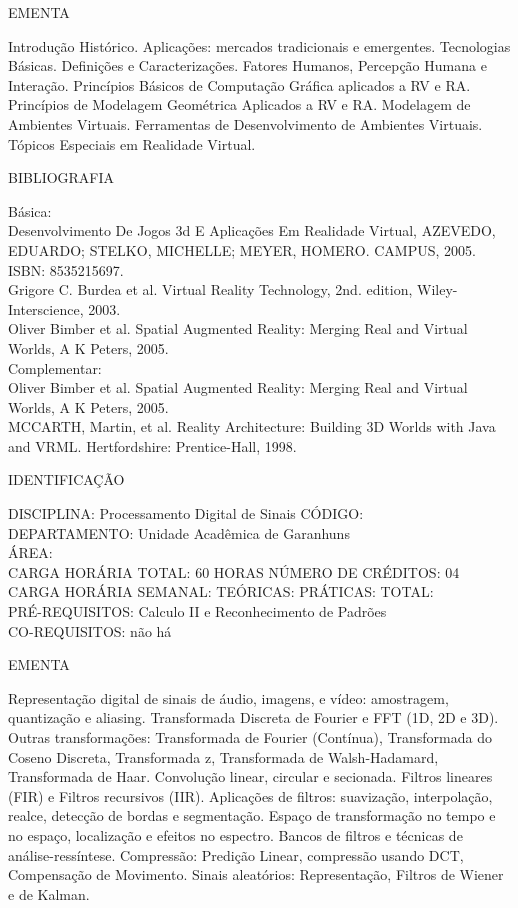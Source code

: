 \documentclass[
	12pt,				%
	openright,			%
  oneside,     %
	a4paper,			%
	chapter=TITLE,		%
	english,			%
	french,				%
	spanish,			%
	brazil				%
	]{abntex2}
\begin{document}
\begin{apendicesenv}
EMENTA 

Introdução  Histórico. Aplicações: mercados tradicionais e
emergentes. Tecnologias Básicas. Definições e Caracterizações. Fatores
Humanos, Percepção Humana e Interação. Princípios Básicos de Computação
Gráfica aplicados a RV e RA. Princípios de Modelagem Geométrica
Aplicados a RV e RA. Modelagem de Ambientes Virtuais. Ferramentas de
Desenvolvimento de Ambientes Virtuais. Tópicos Especiais em Realidade
Virtual.

BIBLIOGRAFIA 

Básica:\\
Desenvolvimento De Jogos 3d E Aplicações Em Realidade Virtual, AZEVEDO,
EDUARDO; STELKO, MICHELLE; MEYER, HOMERO. CAMPUS, 2005. ISBN:
8535215697.\\
Grigore C. Burdea et al. Virtual Reality Technology, 2nd. edition,
Wiley-Interscience, 2003.\\
Oliver Bimber et al. Spatial Augmented Reality: Merging Real and Virtual
Worlds, A K Peters, 2005.\\
Complementar:\\
Oliver Bimber et al. Spatial Augmented Reality: Merging Real and Virtual
Worlds, A K Peters, 2005.\\
MCCARTH, Martin, et al. Reality Architecture: Building 3D Worlds with
Java and VRML. Hertfordshire: Prentice-Hall, 1998.

\newpage IDENTIFICAÇÃO

DISCIPLINA: Processamento Digital de Sinais CÓDIGO:\\
DEPARTAMENTO: Unidade Acadêmica de Garanhuns\\
ÁREA:\\
CARGA HORÁRIA TOTAL: 60 HORAS NÚMERO DE CRÉDITOS: 04\\
CARGA HORÁRIA SEMANAL: TEÓRICAS: PRÁTICAS: TOTAL:\\
PRÉ-REQUISITOS: Calculo II e Reconhecimento de Padrões\\
CO-REQUISITOS: não há

EMENTA 

Representação digital de sinais de áudio, imagens, e vídeo: amostragem,
quantização e  aliasing. Transformada Discreta de Fourier e FFT (1D, 2D e 3D). Outras
transformações: Transformada de Fourier (Contínua), Transformada do
Coseno Discreta, Transformada z, Transformada de Walsh-Hadamard,
Transformada de Haar. Convolução linear, circular e secionada. Filtros
lineares (FIR) e Filtros recursivos (IIR). Aplicações de filtros:
suavização, interpolação, realce, detecção de bordas e segmentação.
Espaço de transformação no tempo e no espaço, localização e efeitos no
espectro. Bancos de filtros e técnicas de análise-ressíntese.
Compressão: Predição Linear, compressão usando DCT, Compensação de
Movimento. Sinais aleatórios: Representação, Filtros de Wiener e de
Kalman.


\end{apendicesenv}
\end{document}
